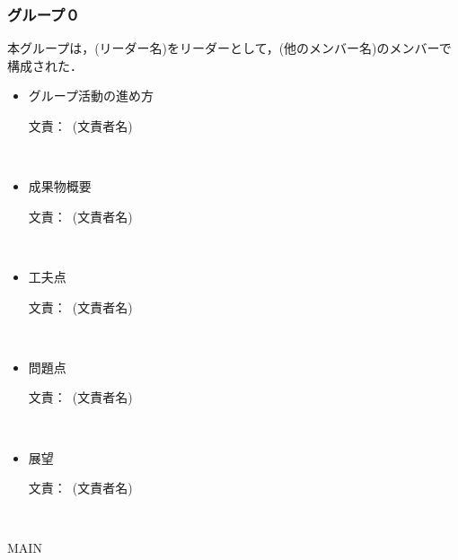 \documentclass[a4paper]{jarticle}
\newcommand{\resp}[1]{\begin{flushright}文責：~#1\end{flushright}~\\}
\begin{document}
\fi

\subsubsection{グループ０}
    
    本グループは，(リーダー名)をリーダーとして，(他のメンバー名)のメンバーで構成された．

    \begin{itemize}
        \item グループ活動の進め方
        
        \resp{(文責者名)}


        \item 成果物概要
        
        \resp{(文責者名)}


        \item 工夫点
        
        \resp{(文責者名)}


        \item 問題点
        
        \resp{(文責者名)}


        \item 展望
        
        \resp{(文責者名)}


    \end{itemize}

\expandafter\ifx\csname MAIN \endcsname\relax
  
\end{document}
